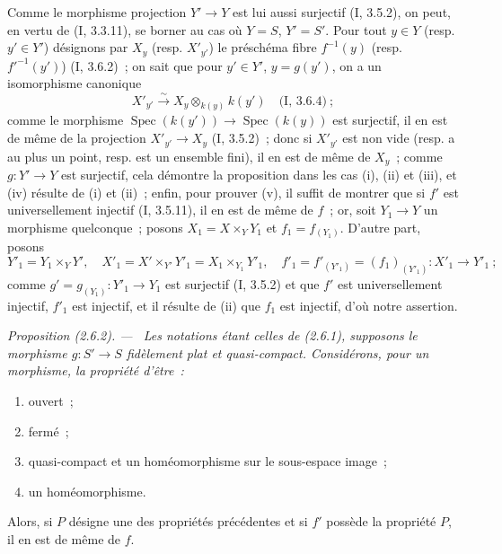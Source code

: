 \documentclass[10pt,oneside]{book}
\newenvironment{proposition}[1][]{%
  \par\medskip\noindent\itshape Proposition (#1). ---\ }{\par}
\begin{document}
Comme le morphisme projection $Y'\to Y$ est lui aussi surjectif (I, 3.5.2),
on peut, en vertu de (I, 3.3.11), se borner au cas où $Y=S$, $Y'=S'$. Pour
tout $y\in Y$ (resp. $y'\in Y'$) désignons par $X_y$ (resp. $X'_{y'}$) le
préschéma fibre $f^{-1}(y)$ (resp. $f'^{-1}(y')$) (I, 3.6.2)~; on sait que
pour $y'\in Y'$, $y=g(y')$, on a un isomorphisme canonique
\[
X'_{y'}\xrightarrow{\sim}X_y\otimes_{k(y)}k(y')\quad\text{(I, 3.6.4)}~;
\]
comme le morphisme $\operatorname{Spec}(k(y'))\to\operatorname{Spec}(k(y))$
est surjectif, il en est de même de la projection $X'_{y'}\to X_y$
(I, 3.5.2)~; donc si $X'_{y'}$ est non vide (resp. a au plus un point, resp.
est un ensemble fini), il en est de même de $X_y$~; comme $g:Y'\to Y$ est
surjectif, cela démontre la proposition dans les cas (i), (ii) et (iii), et
(iv) résulte de (i) et (ii)~; enfin, pour prouver (v), il suffit de montrer
que si $f'$ est universellement injectif (I, 3.5.11), il en est de même de
$f$~; or, soit $Y_1\to Y$ un morphisme quelconque~; posons
$X_1=X\times_Y Y_1$ et $f_1=f_{(Y_1)}$. D'autre part, posons
\[
Y'_1=Y_1\times_Y Y',\quad X'_1=X'\times_{Y'}Y'_1=X_1\times_{Y_1}Y'_1,
\quad f'_1=f'_{(Y'_1)}=(f_1)_{(Y'_1)}:X'_1\to Y'_1~;
\]
comme $g'=g_{(Y_1)}:Y'_1\to Y_1$ est surjectif (I, 3.5.2) et que $f'$ est
universellement injectif, $f'_1$ est injectif, et il résulte de (ii) que
$f_1$ est injectif, d'où notre assertion.

\begin{proposition}[2.6.2]
\label{IV.2.6.2-fr}
Les notations étant celles de (2.6.1), supposons le morphisme $g:S'\to S$
fidèlement plat et quasi-compact. Considérons, pour un morphisme, la propriété
d'être~:
\begin{enumerate}
\item[(i)] ouvert~;
\item[(ii)] fermé~;
\item[(iii)] quasi-compact et un homéomorphisme sur le sous-espace image~;
\item[(iv)] un homéomorphisme.
\end{enumerate}
Alors, si $P$ désigne une des propriétés précédentes et si $f'$ possède la
propriété $P$, il en est de même de $f$.
\end{proposition}
\end{document}
